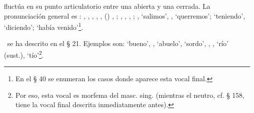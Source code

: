 \textipa{[-u]} fluctúa en su punto articulatorio entre una \textipa{[u]}
abierta y una \textipa{[o]} cerrada. La pronunciación general es
\textipa{[-u]}: ,
,
,
,
,
() ,
;
,
,
,
;
,
 `salimos',
,
 `querremos';
 `teniendo',
 `diciendo';
`había venido'\footnote{En el § 40
se enumeran los casos donde aparece esta vocal final.}.

\uc\ se ha descrito en el § 21. Ejemplos son:
 `bueno',
,
 `abuelo',
 `sordo',
,
,
 `río' (sust.),
`tío'\footnote{Por eso, esta vocal es morfema del masc. sing. (mientras el
neutro, cf. § 158, tiene la vocal final descrita inmediatamente antes).}.

